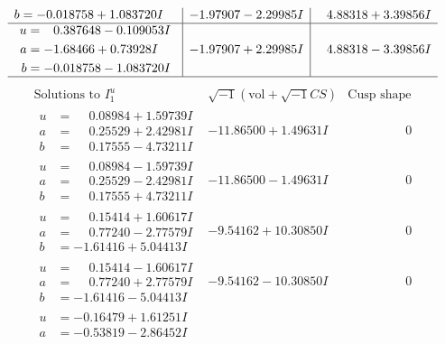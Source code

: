 \documentclass[1p]{elsarticle_modified}
\theoremstyle{definition}
\newcommand{\I}{\sqrt{-1}}
\begin{document}
$$\begin{array}{c|c|c}
\begin{aligned}
b &= -0.018758 + 1.083720 I\end{aligned}
 & -1.97907 - 2.29985 I & \phantom{-}4.88318 + 3.39856 I \\ \hline\begin{aligned}
u &= \phantom{-}0.387648 - 0.109053 I \\
a &= -1.68466 + 0.73928 I \\
b &= -0.018758 - 1.083720 I\end{aligned}
 & -1.97907 + 2.29985 I & \phantom{-}4.88318 - 3.39856 I\\
 \hline 
 \end{array}$$\newpage$$\begin{array}{c|c|c}  
\text{Solutions to }I^u_{1}& \I (\text{vol} + \sqrt{-1}CS) & \text{Cusp shape}\\
 \hline 
\begin{aligned}
u &= \phantom{-}0.08984 + 1.59739 I \\
a &= \phantom{-}0.25529 + 2.42981 I \\
b &= \phantom{-}0.17555 - 4.73211 I\end{aligned}
 & -11.86500 + 1.49631 I & \phantom{-0.000000 } 0 \\ \hline\begin{aligned}
u &= \phantom{-}0.08984 - 1.59739 I \\
a &= \phantom{-}0.25529 - 2.42981 I \\
b &= \phantom{-}0.17555 + 4.73211 I\end{aligned}
 & -11.86500 - 1.49631 I & \phantom{-0.000000 } 0 \\ \hline\begin{aligned}
u &= \phantom{-}0.15414 + 1.60617 I \\
a &= \phantom{-}0.77240 - 2.77579 I \\
b &= -1.61416 + 5.04413 I\end{aligned}
 & -9.54162 + 10.30850 I & \phantom{-0.000000 } 0 \\ \hline\begin{aligned}
u &= \phantom{-}0.15414 - 1.60617 I \\
a &= \phantom{-}0.77240 + 2.77579 I \\
b &= -1.61416 - 5.04413 I\end{aligned}
 & -9.54162 - 10.30850 I & \phantom{-0.000000 } 0 \\ \hline\begin{aligned}
u &= -0.16479 + 1.61251 I \\
a &= -0.53819 - 2.86452 I \\

\end{aligned}
\end{array}$$
\end{document}
